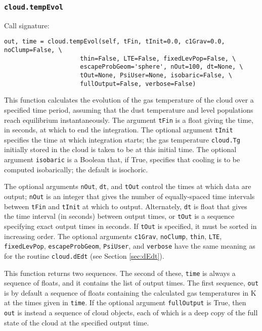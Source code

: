 \documentclass[12pt]{article}
\begin{document}
\subsubsection{\texttt{cloud.tempEvol}}
\label{sec:tempevol}

Call signature:

\begin{verbatim}
out, time = cloud.tempEvol(self, tFin, tInit=0.0, c1Grav=0.0, noClump=False, \
                     thin=False, LTE=False, fixedLevPop=False, \
                     escapeProbGeom='sphere', nOut=100, dt=None, \
                     tOut=None, PsiUser=None, isobaric=False, \
                     fullOutput=False, verbose=False)
\end{verbatim}

This function calculates the evolution of the gas temperature of the cloud over a specified time period, assuming that the dust temperature and level populations reach equilibrium instantaneously. The argument \verb=tFin= is a float giving the time, in seconds, at which to end the integration. The optional argument \verb=tInit= specifies the time at which integration starts; the gas temperature \verb=cloud.Tg= initially stored in the cloud is taken to be at this initial time. The optional argument \verb=isobaric= is a Boolean that, if True, specifies that cooling is to be computed isobarically; the default is isochoric.

The optional arguments \verb=nOut=, \verb=dt=, and \verb=tOut= control the times at which data are output; \verb=nOut= is an integer that gives the number of equally-spaced time intervals between \verb=tFin= and \verb=tInit= at which to output. Alternately, \verb=dt= is float that gives the time interval (in seconds) between output times, or \verb=tOut= is a sequence specifying exact output times in seconds. If \verb=tOut= is specified, it must be sorted in increasing order. The optional arguments \verb=c1Grav=, \verb=noClump=, \verb=thin=, \verb=LTE=, \verb=fixedLevPop=, \verb=escapeProbGeom=, \verb=PsiUser=, and \verb=verbose= have the same meaning as for the routine \verb=cloud.dEdt= (see Section \ref{sec:dEdt}). 

This function returns two sequences. The second of these, \verb=time= is always a sequence of floats, and it contains the list of output times. The first sequence, \verb=out= is by default a sequence of floats containing the calculated gas temperatures in K at the times given in \verb=time=. If the optional argument \verb=fullOutput= is True, then \verb=out= is instead a sequence of cloud objects, each of which is a deep copy of the full state of the cloud at the specified output time.
\end{document}

